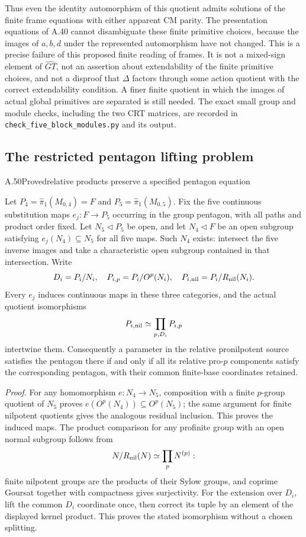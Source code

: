 Thus even the identity automorphism of this quotient admits solutions of
the finite frame equations with either apparent CM parity. The
presentation equations of A.40 cannot disambiguate these finite primitive
choices, because the images of $a,b,d$ under the represented automorphism
have not changed. This is a precise failure of this proposed finite
reading of frames. It is not a mixed-sign element of $\widehat{GT}$, not
an assertion about extendability of the finite primitive choices, and not
a disproof that $\Delta$ factors through some action quotient with the
correct extendability condition. A finer finite quotient in which the
images of actual global primitives are separated is still needed.
The exact small group and module checks, including the two CRT matrices,
are recorded in \texttt{check\_five\_block\_modules.py} and its output.

\subsection{The restricted pentagon lifting problem}


\begin{statement}{A.50}{Proved}{relative products preserve a specified pentagon equation}
\end{statement}
Let $P_4=\widehat\pi_1(M_{0,4})=F$ and
$P_5=\widehat\pi_1(M_{0,5})$. Fix the five continuous
substitution maps $e_j:F\to P_5$ occurring in the group
pentagon, with all paths and product order fixed. Let
$N_5\triangleleft P_5$ be open, and let $N_4\triangleleft F$
be an open subgroup satisfying $e_j(N_4)\subseteq N_5$ for
all five maps. Such $N_4$ exists: intersect the five inverse
images and take a characteristic open subgroup contained in
that intersection. Write
\[
 D_i=P_i/N_i,\quad P_{i,p}=P_i/O^p(N_i),\quad
 P_{i,\rm nil}=P_i/R_{\rm nil}(N_i).
\]
Every $e_j$ induces continuous maps in these three categories,
and the actual quotient isomorphisms
\[
 P_{i,\rm nil}\simeq\prod_{p,D_i}P_{i,p}
\]
intertwine them. Consequently a parameter in the relative
pronilpotent source satisfies the pentagon there if and only if
all its relative pro-$p$ components satisfy the corresponding
pentagon, with their common finite-base coordinates retained.

\emph{Proof.}
For any homomorphism $e:N_4\to N_5$, composition with a finite
$p$-group quotient of $N_5$ proves
$e(O^p(N_4))\subseteq O^p(N_5)$; the same argument for finite
nilpotent quotients gives the analogous residual inclusion.
This proves the induced maps. The product comparison for any
profinite group with an open normal subgroup follows from
\[
 N/R_{\rm nil}(N)\simeq\prod_pN^{(p)}:
\]
finite nilpotent groups are the products of their Sylow groups,
and coprime Goursat together with compactness gives surjectivity.
For the extension over $D_i$, lift the common $D_i$ coordinate
once, then correct its tuple by an element of the displayed
kernel product. This proves the stated isomorphism without a
chosen splitting.

